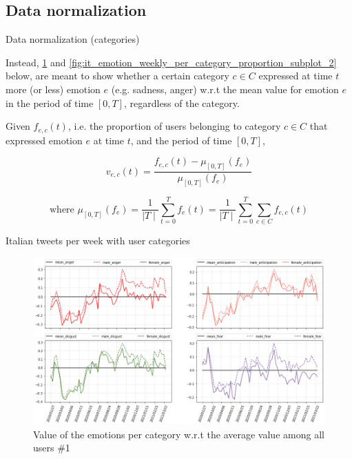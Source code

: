 \documentclass[8pt]{beamer}  %
\begin{document}
\subsection{Data normalization}

\begin{frame}{Data normalization (categories)}
	
	Instead, \cref{fig:it_emotion_weekly_per_category_proportion_subplot_1} and \cref{fig:it_emotion_weekly_per_category_proportion_subplot_2} below, are meant to show whether a certain category \(c \in C\) expressed at time \(t\) more (or less) emotion \(e\) (e.g. sadness, anger) w.r.t the mean value for emotion \(e\) in the period of time \([0, T]\), regardless of the category.
	
	\begin{definition}
	    Given \(f_{e, c}(t)\), i.e. the proportion of users belonging to category \(c \in C\) that expressed emotion \(e\) at time \(t\), and the period of time \([0,T]\),
	    
	    \[v_{e, c}(t) = \frac{f_{e, c}(t) - \mu_{[0,T]}(f_e)}{\mu_{[0,T]}(f_e)}\]
	    
	    \[\text{where } \mu_{[0,T]}(f_e) = \frac{1}{\mid T \mid} \sum_{t =0}^{T} f_e(t) = \frac{1}{\mid T \mid} \sum_{t =0}^{T} \sum_{c \in C} f_{e, c}(t)\] 
	\end{definition}
	
\end{frame}

\begin{frame}{Italian tweets per week with user categories}
	
	\begin{figure}[h]
    	\includegraphics[scale=.30]{assets/img/it_emotions_per_category_wrt_total_proportion_subplots_1.png}
    	\caption{Value of the emotions per category w.r.t the average value among all users \#1}
    	\label{fig:it_emotion_weekly_per_category_proportion_subplot_1}
    \end{figure}
	
\end{frame}
\end{document}

